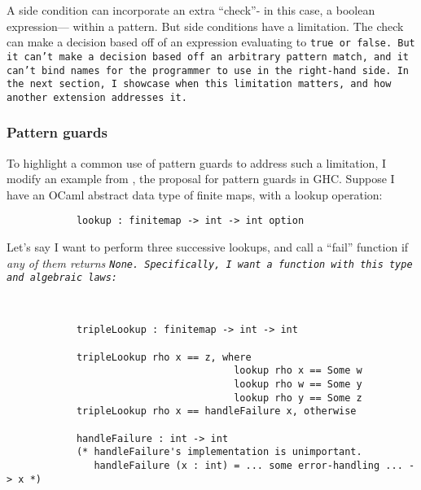 \documentclass[manuscript,screen,review, 12pt, nonacm]{acmart}
\begin{document}
    A side condition can incorporate an extra “check”- in this case, a boolean
    expression--- within a pattern. But side conditions have a limitation. The
    check can make a decision based off of an expression evaluating to \tt{true}
    or \tt{false}. But it can't make a decision based off an arbitrary pattern
    match, and it can't bind names for the programmer to use in the right-hand
    side. In the next section, I showcase when this limitation matters, and how
    another extension addresses it. 

    \subsubsection{Pattern guards}
    \label{guards}

    To highlight a common use of pattern guards to address such a limitation, I
    modify an example from \citet{guardproposal}, the proposal for pattern
    guards in GHC. Suppose I have an OCaml abstract data type of finite maps,
    with a lookup operation: 

    \begin{minipage}[t]{\textwidth}
        \centering 
        \begin{verbatim}
            lookup : finitemap -> int -> int option
        \end{verbatim}
    \end{minipage}
    Let's say I want to perform three successive lookups, and call a “fail”
    function if \it{any} of them returns \tt{None}. Specifically, I want a
    function with this type and algebraic laws: 

    \begin{minipage}[t]{\textwidth}
        \centering 
        \begin{verbatim}
          

            tripleLookup : finitemap -> int -> int

            tripleLookup rho x == z, where 
                                       lookup rho x == Some w
                                       lookup rho w == Some y
                                       lookup rho y == Some z
            tripleLookup rho x == handleFailure x, otherwise
            
            handleFailure : int -> int 
            (* handleFailure's implementation is unimportant.
               handleFailure (x : int) = ... some error-handling ... -> x *)  

        \end{verbatim}
    \end{minipage}
\end{document}
